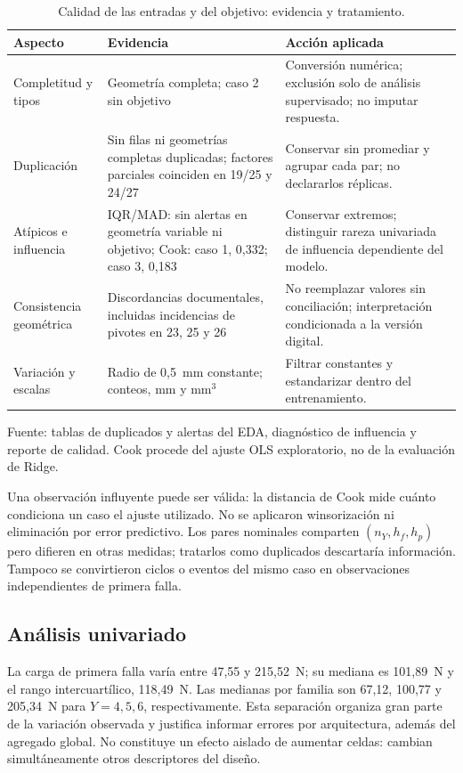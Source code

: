 \begin{table}[htbp]
\centering\small{}
\caption{Calidad de las entradas y del objetivo: evidencia y tratamiento.}
\label{tab:calidad}
\begin{tabularx}{\linewidth}{@{}YYY@{}}
\toprule
Aspecto & Evidencia & Acción aplicada \\
\midrule
Completitud y tipos & Geometría completa; caso 2 sin objetivo & Conversión numérica; exclusión solo de análisis supervisado; no imputar respuesta. \\
\addlinespace
Duplicación & Sin filas ni geometrías completas duplicadas; factores parciales coinciden en 19/25 y 24/27 & Conservar sin promediar y agrupar cada par; no declararlos réplicas. \\
\addlinespace
Atípicos e influencia & IQR/MAD: sin alertas en geometría variable ni objetivo; Cook: caso 1, 0,332; caso 3, 0,183 & Conservar extremos; distinguir rareza univariada de influencia dependiente del modelo. \\
\addlinespace
Consistencia geométrica & Discordancias documentales, incluidas incidencias de pivotes en 23, 25 y 26 & No reemplazar valores sin conciliación; interpretación condicionada a la versión digital. \\
\addlinespace
Variación y escalas & Radio de 0,5~mm constante; conteos, mm y mm$^3$ & Filtrar constantes y estandarizar dentro del entrenamiento. \\
\bottomrule
\end{tabularx}
\par\smallskip\small Fuente: tablas de duplicados y alertas del EDA, diagnóstico de influencia y reporte de calidad. Cook procede del ajuste OLS exploratorio, no de la evaluación de Ridge.
\end{table}

Una observación influyente puede ser válida: la distancia de Cook mide cuánto condiciona un caso el ajuste utilizado. No se aplicaron winsorización ni eliminación por error predictivo. Los pares nominales comparten $(n_Y,h_f,h_p)$ pero difieren en otras medidas; tratarlos como duplicados descartaría información. Tampoco se convirtieron ciclos o eventos del mismo caso en observaciones independientes de primera falla.

\subsection{Análisis univariado}
La carga de primera falla varía entre 47,55 y 215,52~N; su mediana es 101,89~N y el rango intercuartílico, 118,49~N. Las medianas por familia son 67,12, 100,77 y 205,34~N para $Y=4,5,6$, respectivamente. Esta separación organiza gran parte de la variación observada y justifica informar errores por arquitectura, además del agregado global. No constituye un efecto aislado de aumentar celdas: cambian simultáneamente otros descriptores del diseño.

